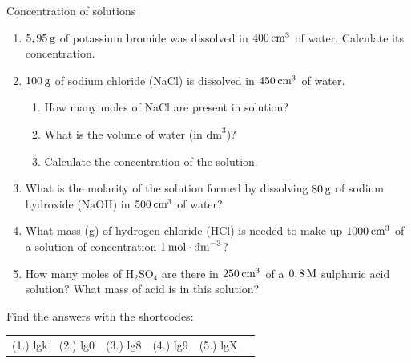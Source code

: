             \begin{exercises}{ Concentration of solutions
      }
            \nopagebreak
      \label{m38712*id283713}\begin{enumerate}[noitemsep, label=\textbf{\arabic*}. ] 
            \label{m38712*uid92}\item $5,95\phantom{\rule{2pt}{0ex}}\text{g}$ of potassium bromide was dissolved in $400\phantom{\rule{2pt}{0ex}}{\text{cm}}^{3}$ of water. Calculate its concentration.\newline
\label{m38712*uid93}\item $100\phantom{\rule{2pt}{0ex}}\text{g}$ of sodium chloride (NaCl) is dissolved in $450\phantom{\rule{2pt}{0ex}}{\text{cm}}^{3}$ of water.
\label{m38712*id283768}\begin{enumerate}[noitemsep, label=\textbf{\alph*}. ] 
            \label{m38712*uid94}\item How many moles of NaCl are present in solution?
\label{m38712*uid95}\item What is the volume of water (in ${\text{dm}}^{3}$)?
\label{m38712*uid96}\item Calculate the concentration of the solution.
\end{enumerate}
                \label{m38712*uid98}\item What is the molarity of the solution formed by dissolving $80\phantom{\rule{2pt}{0ex}}\text{g}$ of sodium hydroxide ($\text{NaOH}$) in $500\phantom{\rule{2pt}{0ex}}{\text{cm}}^{3}$ of water?\newline
\label{m38712*uid99}\item What mass (g) of hydrogen chloride ($\text{HCl}$) is needed to make up $1000\phantom{\rule{2pt}{0ex}}{\text{cm}}^{3}$ of a solution of concentration $1\phantom{\rule{2pt}{0ex}}\text{mol}\ensuremath{\cdot}{\text{dm}}^{-3}$?\newline
\label{m38712*uid100}\item How many moles of $\text{H}{}_{2}\text{SO}{}_{4}$ are there in $250\phantom{\rule{2pt}{0ex}}{\text{cm}}^{3}$ of a $0,8\phantom{\rule{2pt}{0ex}}\text{M}$ sulphuric acid solution? What mass of acid is in this solution?\newline
\end{enumerate}
    \label{m38712*cid9}
\par {} Find the answers with the shortcodes:
 \par \begin{tabular}[h]{cccccc}
 (1.) lgk  &  (2.) lg0  &  (3.) lg8  &  (4.) lg9  &  (5.) lgX  & \end{tabular}
\end{exercises}

